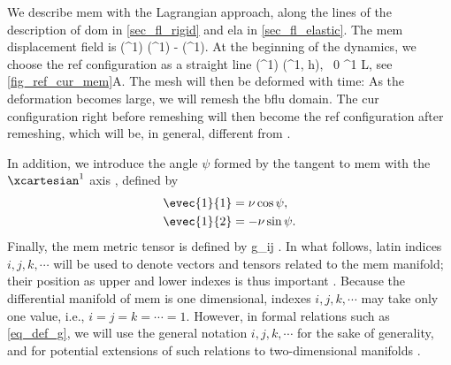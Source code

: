 We describe \ac{mem} with the Lagrangian approach, along the lines of the description of \ac{dom} in \cref{sec_fl_rigid} and \ac{ela}  in \cref{sec_fl_elastic}.  The \ac{mem} displacement field is
\be\label{eq_u_mem}
\bumem(\xcoord^1) \equiv \bxmemc(\xcoord^1) - \bxmemr(\xcoord^1).
\ee
At the beginning of the dynamics, we choose the \ac{ref} configuration as a straight line
\be
\label{eq_def_x_ref}
\bxmemr(\xcoord^1) \equiv (\xcoord^1, h), \, 0 \leq  \xcoord^1 \leq L,
\ee
see \cref{fig_ref_cur_mem}A.
The mesh will then be deformed with time: As the deformation becomes large, we will remesh the \ac{bflu} domain. The \ac{cur} configuration right before remeshing will then become the \ac{ref} configuration after remeshing, which will be, in general,  different from .
%


In addition, we introduce the  angle $\psi$ formed by the tangent to \ac{mem} with the $\xcartesian^1$ axis \cite{derenyiFormationInteractionMembrane2002}, defined by
\begin{align}
        \label{def_nu_psi_1}
        \evec{1}{1} & = \nu \cos \psi, \\
        \label{def_nu_psi_2}
        \evec{1}{2} & =-\nu \sin \psi.
\end{align}
Finally, the \ac{mem} metric tensor is defined by  \cite{marchiafavaAppuntiDiGeometria2005}
\be\label{eq_def_g}
g_{ij} \equiv {} \cdot {}.
\ee
In what follows, latin indices $i, j, k, \cdots$ will be used to denote vectors and tensors related to the \ac{mem} manifold; their position as upper and lower indexes is thus important \cite{marchiafavaAppuntiDiGeometria2005}. Because the differential manifold of \ac{mem} is one dimensional, indexes $i, j, k, \cdots$ may take only one value, i.e., $i=j=k= \cdots=1$. However, in formal relations such as \cref{eq_def_g}, we will use the general notation $i, j, k, \cdots$  for the sake of  generality, and for potential extensions of such relations to two-dimensional manifolds \cite{desernoFluidLipidMembranes2015}.
\vspace{0.5cm}\\


